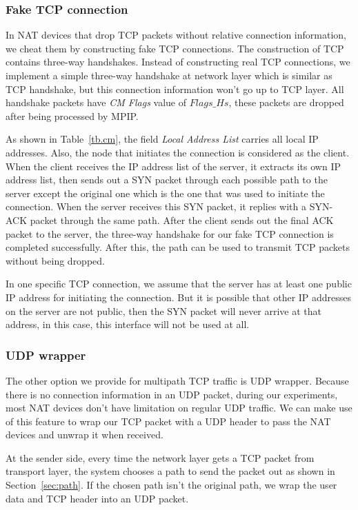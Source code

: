 \subsubsection{Fake TCP connection}
In NAT devices that drop TCP packets without relative connection information, we cheat them by constructing fake TCP connections. The construction of TCP contains three-way handshakes. Instead of constructing real TCP connections, we implement a simple three-way handshake at network layer which is similar as TCP handshake, but this connection information won't go up to TCP layer. All handshake packets have \emph{CM Flags} value of $Flags\_Hs$, these packets are dropped after being processed by MPIP.

As shown in Table~\ref{tb.cm}, the field \emph{Local Address List} carries all local IP addresses. Also, the node that initiates the connection is considered as the client. When the client receives the IP address list of the server, it extracts its own IP address list, then sends out a SYN packet through each possible path to the server except the original one which is the one that was used to initiate the connection. When the server receives this SYN packet, it replies with a SYN-ACK packet through the same path. After the client sends out the final ACK packet to the server, the three-way handshake for our fake TCP connection is completed successfully. After this, the path can be used to transmit TCP packets without being dropped. 

In one specific TCP connection, we assume that the server has at least one public IP address for initiating the connection. But it is possible that other IP addresses on the server are not public, then the SYN packet will never arrive at that address, in this case, this interface will not be used at all.

\subsubsection{UDP wrapper}
The other option we provide for multipath TCP traffic is UDP wrapper. Because there is no connection information in an UDP packet, during our experiments, most NAT devices don't have limitation on regular UDP traffic. We can make use of this feature to wrap our TCP packet with a UDP header to pass the NAT devices and unwrap it when received.

At the sender side, every time the network layer gets a TCP packet from transport layer, the system chooses a path to send the packet out as shown in Section~\ref{sec:path}. If the chosen path isn't the original path, we wrap the user data and TCP header into an UDP packet.

